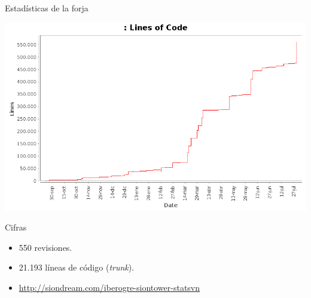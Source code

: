 \documentclass[green]{beamer}
\begin{document}
\begin{frame}{Estadísticas de la forja}
    
    \begin{center}
	\includegraphics[scale=0.25]{img/loc.png}
    \end{center}
    
    \begin{block}{Cifras}
	\begin{itemize}
	    \item 550 revisiones.
	    \item 21.193 líneas de código (\textit{trunk}).
	    \item \url{http://siondream.com/iberogre-siontower-statsvn}
	\end{itemize}
    \end{block}
\end{frame}

    
\end{document}
